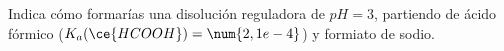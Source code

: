Indica cómo formarías una disolución reguladora de $pH = 3$, partiendo de ácido fórmico ($K_a(\ce{HCOOH}) = \num{2,1e-4}$) y formiato de sodio.
